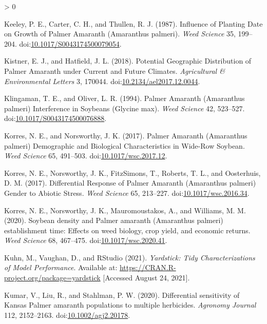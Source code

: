 \documentclass[utf8]{frontiersSCNS}
\newlength{\cslhangindent}
\newenvironment{CSLReferences}[2] %
 {%
  \setlength{\parindent}{0pt}
  \ifodd #1 \everypar{\setlength{\hangindent}{\cslhangindent}}\ignorespaces\fi
  \ifnum #2 > 0
  \setlength{\parskip}{#2\baselineskip}
  \fi
 }%
 {}
\begin{document}
\begin{CSLReferences}{1}{0}
\leavevmode\hypertarget{ref-keeley1987}{}%
Keeley, P. E., Carter, C. H., and Thullen, R. J. (1987). Influence of
{Planting Date} on {Growth} of {Palmer Amaranth} ({Amaranthus} palmeri).
\emph{Weed Science} 35, 199--204.
doi:\href{https://doi.org/10.1017/S0043174500079054}{10.1017/S0043174500079054}.

\leavevmode\hypertarget{ref-kistner2018}{}%
Kistner, E. J., and Hatfield, J. L. (2018). Potential {Geographic
Distribution} of {Palmer Amaranth} under {Current} and {Future
Climates}. \emph{Agricultural \& Environmental Letters} 3, 170044.
doi:\href{https://doi.org/10.2134/ael2017.12.0044}{10.2134/ael2017.12.0044}.

\leavevmode\hypertarget{ref-klingaman1994}{}%
Klingaman, T. E., and Oliver, L. R. (1994). Palmer {Amaranth}
({Amaranthus} palmeri) {Interference} in {Soybeans} ({Glycine} max).
\emph{Weed Science} 42, 523--527.
doi:\href{https://doi.org/10.1017/S0043174500076888}{10.1017/S0043174500076888}.

\leavevmode\hypertarget{ref-korres2017a}{}%
Korres, N. E., and Norsworthy, J. K. (2017). Palmer {Amaranth}
({Amaranthus} palmeri) {Demographic} and {Biological Characteristics} in
{Wide}-{Row Soybean}. \emph{Weed Science} 65, 491--503.
doi:\href{https://doi.org/10.1017/wsc.2017.12}{10.1017/wsc.2017.12}.

\leavevmode\hypertarget{ref-korres2017}{}%
Korres, N. E., Norsworthy, J. K., FitzSimons, T., Roberts, T. L., and
Oosterhuis, D. M. (2017). Differential {Response} of {Palmer Amaranth}
({Amaranthus} palmeri) {Gender} to {Abiotic Stress}. \emph{Weed Science}
65, 213--227.
doi:\href{https://doi.org/10.1017/wsc.2016.34}{10.1017/wsc.2016.34}.

\leavevmode\hypertarget{ref-korres2020}{}%
Korres, N. E., Norsworthy, J. K., Mauromoustakos, A., and Williams, M.
M. (2020). Soybean density and {Palmer} amaranth ({Amaranthus} palmeri)
establishment time: Effects on weed biology, crop yield, and economic
returns. \emph{Weed Science} 68, 467--475.
doi:\href{https://doi.org/10.1017/wsc.2020.41}{10.1017/wsc.2020.41}.

\leavevmode\hypertarget{ref-kuhn2021}{}%
Kuhn, M., Vaughan, D., and RStudio (2021). \emph{Yardstick: {Tidy
Characterizations} of {Model Performance}}. Available at:
\url{https://CRAN.R-project.org/package=yardstick} {[}Accessed August
24, 2021{]}.

\leavevmode\hypertarget{ref-kumar2020}{}%
Kumar, V., Liu, R., and Stahlman, P. W. (2020). Differential sensitivity
of {Kansas Palmer} amaranth populations to multiple herbicides.
\emph{Agronomy Journal} 112, 2152--2163.
doi:\href{https://doi.org/10.1002/agj2.20178}{10.1002/agj2.20178}.


\end{CSLReferences}
\end{document}
